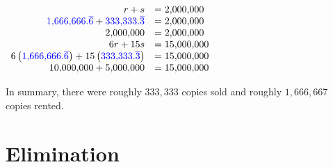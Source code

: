 \documentclass[nooutcomes]{ximera}
\begin{document}
\begin{example}
\begin{center}
$
      \begin{array}{rl}
          r+s &=2{,}000{,}000\\ 
          {\color{blue}{{1{,}666{,}666.\overline{6}}}}+{\color{blue}{{333{,}333.\overline{3}}}} &=2{,}000{,}000\\ 
          2{,}000{,}000&=2{,}000{,}000\\
6r+15s &=15{,}000{,}000\\
6\left({\color{blue}{{1{,}666{,}666.\overline{6}}}}\right)+15\left({\color{blue}{{333{,}333.\overline{3}}}}\right) &=15{,}000{,}000\\
 10{,}000{,}000+5{,}000{,}000 & =15{,}000{,}000
      \end{array}
$
\end{center}
        In summary, there were roughly
        $333{,}333$ copies sold and roughly $1{,}666{,}667$ copies rented.
\end{example}



\section{Elimination}
\end{document}
